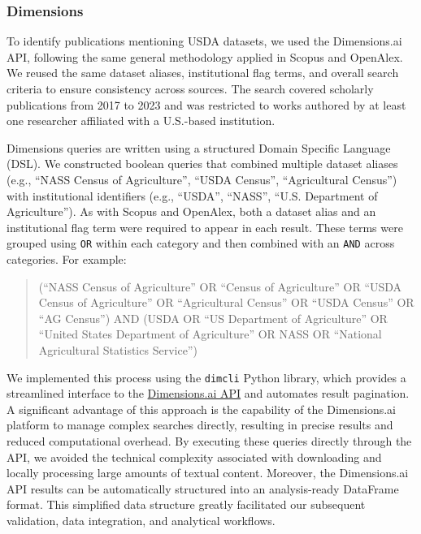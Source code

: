 \documentclass[
  letterpaper,
  DIV=11,
  numbers=noendperiod]{scrartcl}
\begin{document}
\subsubsection{Dimensions}\label{dimensions}

To identify publications mentioning USDA datasets, we used the
Dimensions.ai API, following the same general methodology applied in
Scopus and OpenAlex. We reused the same dataset aliases, institutional
flag terms, and overall search criteria to ensure consistency across
sources. The search covered scholarly publications from 2017 to 2023 and
was restricted to works authored by at least one researcher affiliated
with a U.S.-based institution.

Dimensions queries are written using a structured Domain Specific
Language (DSL). We constructed boolean queries that combined multiple
dataset aliases (e.g., ``NASS Census of Agriculture'', ``USDA Census'',
``Agricultural Census'') with institutional identifiers (e.g., ``USDA'',
``NASS'', ``U.S. Department of Agriculture''). As with Scopus and
OpenAlex, both a dataset alias and an institutional flag term were
required to appear in each result. These terms were grouped using
\texttt{OR} within each category and then combined with an \texttt{AND}
across categories. For example:

\begin{quote}
(``NASS Census of Agriculture'' OR ``Census of Agriculture'' OR ``USDA
Census of Agriculture'' OR ``Agricultural Census'' OR ``USDA Census'' OR
``AG Census'') AND (USDA OR ``US Department of Agriculture'' OR ``United
States Department of Agriculture'' OR NASS OR ``National Agricultural
Statistics Service'')
\end{quote}

We implemented this process using the \texttt{dimcli} Python library,
which provides a streamlined interface to the
\href{https://docs.dimensions.ai/dsl/?_gl=1*tdhazg*_ga*MTgxOTE1MDE2Ny4xNzQ2NjUwMDkw*_ga_CHDNWH4YDX*czE3NDk3NjQzNzkkbzIkZzEkdDE3NDk3NjQzODIkajU3JGwwJGgw}{Dimensions.ai
API} and automates result pagination. A significant advantage of this
approach is the capability of the Dimensions.ai platform to manage
complex searches directly, resulting in precise results and reduced
computational overhead. By executing these queries directly through the
API, we avoided the technical complexity associated with downloading and
locally processing large amounts of textual content. Moreover, the
Dimensions.ai API results can be automatically structured into an
analysis-ready DataFrame format. This simplified data structure greatly
facilitated our subsequent validation, data integration, and analytical
workflows.
\end{document}

